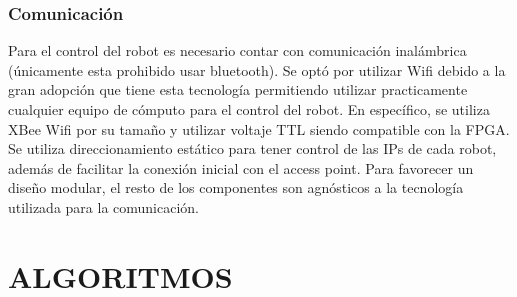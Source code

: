 \documentclass[twocolumn,10pt]{amrob}
\begin{document}
\subsubsection*{Comunicación}
Para el control del robot es necesario contar con comunicación inalámbrica (\'unicamente esta prohibido usar bluetooth). Se opt\'o por utilizar Wifi debido a la gran adopci\'on que tiene esta tecnología permitiendo utilizar practicamente cualquier equipo de cómputo para el control del robot. En específico, se utiliza XBee Wifi por su tamaño y utilizar voltaje TTL siendo compatible con la FPGA. Se utiliza direccionamiento estático para tener control de las IPs de cada robot, además de facilitar la conexión inicial con el access point. Para favorecer un diseño modular, el resto de los componentes son agnósticos a la tecnología utilizada para la comunicación. \par %
\section*{ALGORITMOS}
\end{document}
